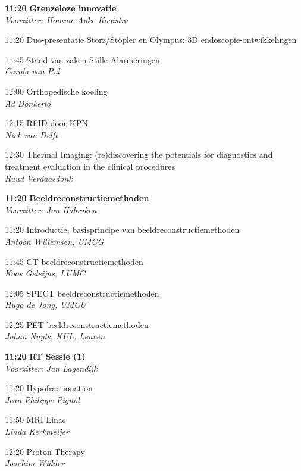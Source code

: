 \documentclass[a4paper,10pt]{report}
\begin{document}
\begin{multicols*}{3}
\vfill
{}
\begin{packed_enum}
\item[\textbf{11:20}]\textbf{Grenzeloze innovatie}\\\textit{Voorzitter: Homme-Auke Kooistra}
\item[11:20] Duo-presentatie Storz/St\"opler en Olympus: 3D endo\-sco\-pie-ontwikkelingen
\item[11:45] Stand van zaken Stille Alarmeringen\\\textit{Carola van Pul}
\item[12:00] Orthopedische koeling\\\textit{Ad Donkerlo}
\item[12:15] RFID door KPN\\\textit{Nick van Delft}
\item[12:30] Thermal Imaging: (re)discovering the potentials for diag\-nostics and treatment evaluation in the clinical procedures\\\textit{Ruud Verdaasdonk}
\end{packed_enum}
\columnbreak

\begin{packed_enum}
\item[\textbf{11:20}]\textbf{Beeldreconstructiemethoden}\\\textit{Voorzitter: Jan Habraken}
\item[11:20] Introductie, basisprincipe van beeldreconstructiemethoden\\\textit{Antoon Willemsen, UMCG}
\item[11:45] CT beeldreconstructiemethoden\\\textit{Koos Geleijns, LUMC}
\item[12:05] SPECT beeldreconstructiemethoden\\\textit{Hugo de Jong, UMCU}
\item[12:25] PET beeldreconstructiemethoden\\\textit{Johan Nuyts, KUL, Leuven}
\end{packed_enum}

\begin{packed_enum}
\item[\textbf{11:20}]{\textbf{RT Sessie (1)}}\\\textit{Voorzitter: Jan Lagendijk}
\item[11:20] Hypofractionation\\\textit{Jean Philippe Pignol}
\item[11:50] MRI Linac\\\textit{Linda Kerkmeijer}
\item[12:20] Proton Therapy\\\textit{Joachim Widder}
\end{packed_enum}


\end{multicols*}
\end{document}
